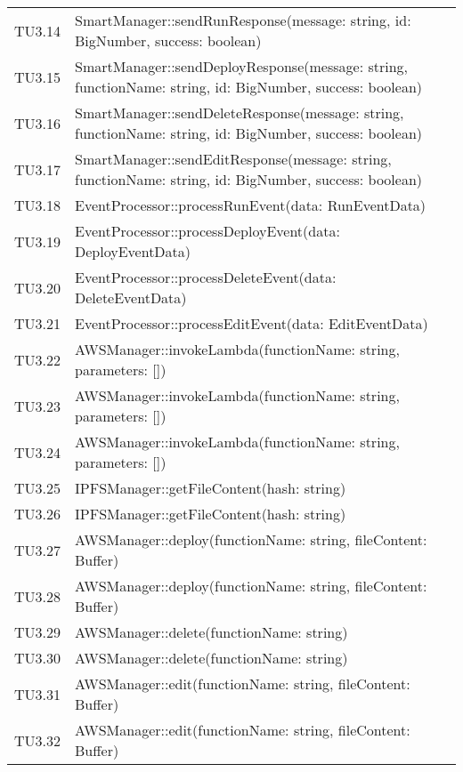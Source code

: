 \begin{longtable}{
		>{\centering}p{}
		>{\centering\arraybackslash}p{}}
	TU3.14 & SmartManager::sendRunResponse(message: string, id: BigNumber, success: boolean) \\
	
	TU3.15 & SmartManager::sendDeployResponse(message: string, functionName: string, id: BigNumber, success: boolean) \\
	
	TU3.16 & SmartManager::sendDeleteResponse(message: string, functionName: string, id: BigNumber, success: boolean) \\
	
	TU3.17 & SmartManager::sendEditResponse(message: string, functionName: string, id: BigNumber, success: boolean) \\
	
	TU3.18 & EventProcessor::processRunEvent(data: RunEventData) \\
	
	TU3.19 & EventProcessor::processDeployEvent(data: DeployEventData) \\
	
	TU3.20 & EventProcessor::processDeleteEvent(data: DeleteEventData) \\
	
	TU3.21 & EventProcessor::processEditEvent(data: EditEventData) \\
	
	TU3.22 & AWSManager::invokeLambda(functionName: string, parameters: []) \\
	
	TU3.23 & AWSManager::invokeLambda(functionName: string, parameters: []) \\
	
	TU3.24 & AWSManager::invokeLambda(functionName: string, parameters: []) \\
	
	TU3.25 & IPFSManager::getFileContent(hash: string) \\
	
	TU3.26 & IPFSManager::getFileContent(hash: string) \\
	
	TU3.27 & AWSManager::deploy(functionName: string, fileContent: Buffer) \\
	
	TU3.28 & AWSManager::deploy(functionName: string, fileContent: Buffer) \\
	
	TU3.29 & AWSManager::delete(functionName: string) \\
	
	TU3.30 & AWSManager::delete(functionName: string) \\
	
	TU3.31 & AWSManager::edit(functionName: string, fileContent: Buffer) \\
	
	TU3.32 & AWSManager::edit(functionName: string, fileContent: Buffer) \\

\end{longtable}
